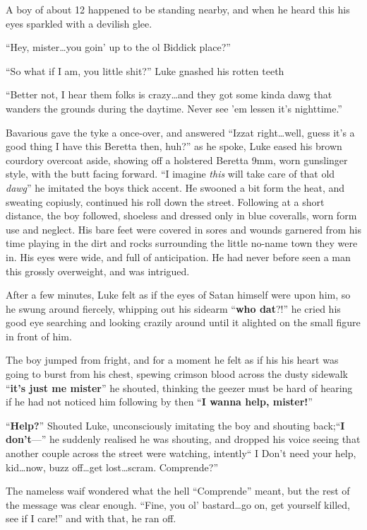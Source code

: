 A boy of about 12 happened to be standing nearby, and when he heard
this his eyes sparkled with a devilish glee.

``Hey, mister{\ldots}you goin' up to the ol Biddick place?''

``So what if I am, you little shit?'' Luke gnashed his rotten
teeth

``Better not, I hear them folks is crazy{\ldots}and they got some kinda
dawg that wanders the grounds during the daytime. Never see 'em
lessen it's nighttime.''

Bavarious gave the tyke a once-over, and answered ``Izzat
right{\ldots}well, guess it's a good thing I have this Beretta then,
huh?'' as he spoke, Luke eased his brown courdory overcoat aside,
showing off a holstered Beretta 9mm, worn gunslinger style, with the
butt facing forward. ``I imagine {\em this} will take care of that old
{\em dawg}'' he imitated the boys thick accent. He swooned a bit form
the heat, and sweating copiusly, continued his roll down the street.
Following at a short distance, the boy followed, shoeless and dressed
only in blue coveralls, worn form use and neglect. His bare feet were
covered in sores and wounds garnered from his time playing in the dirt
and rocks surrounding the little no-name town they were in. His eyes
were wide, and full of anticipation. He had never before seen a man this
grossly overweight, and was intrigued.

After a few minutes, Luke felt as if the eyes of Satan himself were
upon him, so he swung around fiercely, whipping out his sidearm
``{\bf who dat}?!'' he cried his good eye searching and looking crazily
around until it alighted on the small figure in front of him.

The boy jumped from fright, and for a moment he felt as if his his
heart was going to burst from his chest, spewing crimson blood
across the dusty sidewalk ``{\bf it's just me mister}'' he shouted,
thinking the geezer must be hard of hearing if he had not noticed
him following by then ``{\bf I wanna help, mister!}''

``{\bf Help?}'' Shouted Luke, unconsciously imitating the boy and
shouting back;``{\bf I don't}---'' he suddenly realised he was shouting,
and dropped his voice seeing that another couple across the street were
watching, intently`` I Don't need your help, kid{\ldots}now, buzz
off{\ldots}get lost{\ldots}scram. Comprende?''

The nameless waif wondered what the hell ``Comprende'' meant, but the
rest of the message was clear enough. ``Fine, you ol' bastard{\ldots}go
on, get yourself killed, see if I care!'' and with that, he ran
off.

